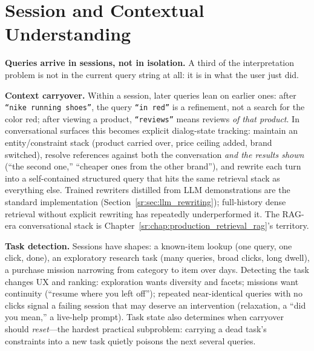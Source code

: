 \section{Session and Contextual Understanding}
\label{sr:sec:session_context}

\textbf{Queries arrive in sessions, not in isolation.} A third of the interpretation problem is not in the current query string at all: it is in what the user just did.

\textbf{Context carryover.} Within a session, later queries lean on earlier ones: after \texttt{``nike running shoes''}, the query \texttt{``in red''} is a refinement, not a search for the color red; after viewing a product, \texttt{``reviews''} means reviews \textit{of that product}. In conversational surfaces this becomes explicit dialog-state tracking: maintain an entity/constraint stack (product carried over, price ceiling added, brand switched), resolve references against both the conversation \textit{and the results shown} (``the second one,'' ``cheaper ones from the other brand''), and rewrite each turn into a self-contained structured query that hits the same retrieval stack as everything else. Trained rewriters distilled from LLM demonstrations are the standard implementation (Section~\ref{sr:sec:llm_rewriting}); full-history dense retrieval without explicit rewriting has repeatedly underperformed it. The RAG-era conversational stack is Chapter~\ref{sr:chap:production_retrieval_rag}'s territory.

\textbf{Task detection.} Sessions have shapes: a known-item lookup (one query, one click, done), an exploratory research task (many queries, broad clicks, long dwell), a purchase mission narrowing from category to item over days. Detecting the task changes UX and ranking: exploration wants diversity and facets; missions want continuity (``resume where you left off''); repeated near-identical queries with no clicks signal a failing session that may deserve an intervention (relaxation, a ``did you mean,'' a live-help prompt). Task state also determines when carryover should \textit{reset}---the hardest practical subproblem: carrying a dead task's constraints into a new task quietly poisons the next several queries.

